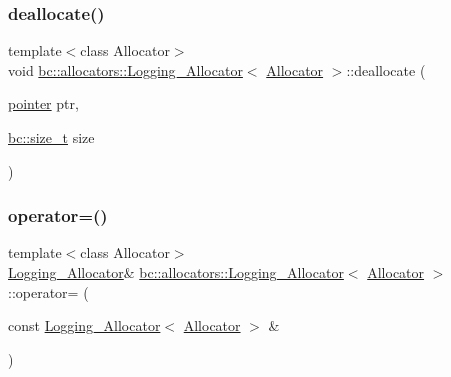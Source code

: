 \mbox{\label{structbc_1_1allocators_1_1Logging__Allocator_a20f40b66932f9e0762a623ebac3415e2}} 
\subsubsection{\texorpdfstring{deallocate()}{deallocate()}}
{\footnotesize\ttfamily template$<$class Allocator$>$ \\
void \hyperlink{structbc_1_1allocators_1_1Logging__Allocator}{bc\+::allocators\+::\+Logging\+\_\+\+Allocator}$<$ \hyperlink{classbc_1_1allocators_1_1Allocator}{Allocator} $>$\+::deallocate (\begin{DoxyParamCaption}\item[{\hyperlink{structbc_1_1allocators_1_1Allocator__Forwarder_ae9d48fbeb22a6686ad59128cf309d8bd}{pointer}}]{ptr,  }\item[{\hyperlink{namespacebc_aaf8e3fbf99b04b1b57c4f80c6f55d3c5}{bc\+::size\+\_\+t}}]{size }\end{DoxyParamCaption})\hspace{0.3cm}{\ttfamily [inline]}}

\mbox{\label{structbc_1_1allocators_1_1Logging__Allocator_a94222880c322c2f72483f036692efae8}} 
\subsubsection{\texorpdfstring{operator=()}{operator=()}\hspace{0.1cm}{\footnotesize\ttfamily [1/2]}}
{\footnotesize\ttfamily template$<$class Allocator$>$ \\
\hyperlink{structbc_1_1allocators_1_1Logging__Allocator}{Logging\+\_\+\+Allocator}\& \hyperlink{structbc_1_1allocators_1_1Logging__Allocator}{bc\+::allocators\+::\+Logging\+\_\+\+Allocator}$<$ \hyperlink{classbc_1_1allocators_1_1Allocator}{Allocator} $>$\+::operator= (\begin{DoxyParamCaption}\item[{const \hyperlink{structbc_1_1allocators_1_1Logging__Allocator}{Logging\+\_\+\+Allocator}$<$ \hyperlink{classbc_1_1allocators_1_1Allocator}{Allocator} $>$ \&}]{ }\end{DoxyParamCaption})\hspace{0.3cm}{\ttfamily [default]}}

